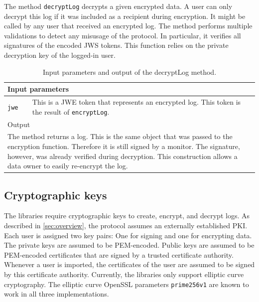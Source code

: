 \documentclass[../main.tex]{subfiles}
\begin{document}
The method \verb|decryptLog| decrypts a given encrypted data.
A user can only decrypt this log if it was included as a recipient during encryption.
It might be called by any user that received an encrypted log.
The method performs multiple validations to detect any misusage of the protocol.
In particular, it verifies all signatures of the encoded JWS tokens.
This function relies on the private decryption key of the logged-in user.
\begin{table}[ht]
    \centering
    \begin{tabular}{|p{3cm}p{10cm}|}
        \hline
        \multicolumn{2}{|l|}{Input parameters}    \\ \hline
        \verb|jwe|              & This is a JWE token that represents an encrypted log. This token is the result of \verb|encryptLog|. \\ \hline
            \multicolumn{2}{|l|}{Output}   \\ \hline
        \multicolumn{2}{|p{13cm}|}{The method returns a log. This is the same object that was passed to the encryption function. Therefore it is still signed by a monitor. The signature, however, was already verified during decryption. This construction allows a data owner to easily re-encrypt the log.} \\ \hline
    \end{tabular}
    \caption[Signature of decryptLog]{Input parameters and output of the decryptLog method.}
\end{table}

\subsection{Cryptographic keys}
The libraries require cryptographic keys to create, encrypt, and decrypt logs.
As described in \cref{sec:overview}, the protocol assumes an externally established PKI.
Each user is assigned two key pairs: 
One for signing and one for encrypting data.
The private keys are assumed to be PEM-encoded.
Public keys are assumed to be PEM-encoded certificates that are signed by a trusted certificate authority.
Whenever a user is imported, the certificates of the user are assumed to be signed by this certificate authority.
Currently, the libraries only support elliptic curve cryptography.
The elliptic curve OpenSSL parameters \verb|prime256v1| are known to work in all three implementations.
\end{document}
